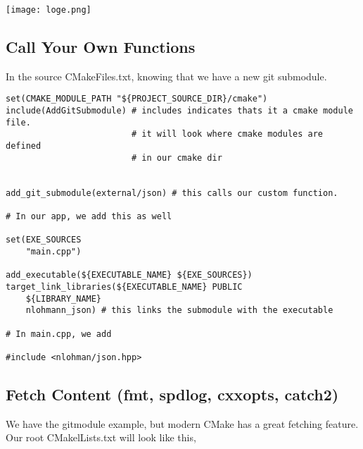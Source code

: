 \documentclass[openany]{report}
\begin{document}
\begin{center}
    \texttt{[image: loge.png]}
\end{center}

\subsection{Call Your Own Functions}

In the source CMakeFiles.txt, knowing that we have a new git submodule.

\begin{verbatim}
set(CMAKE_MODULE_PATH "${PROJECT_SOURCE_DIR}/cmake")
include(AddGitSubmodule) # includes indicates thats it a cmake module file.
                         # it will look where cmake modules are defined
                         # in our cmake dir


add_git_submodule(external/json) # this calls our custom function.

# In our app, we add this as well

set(EXE_SOURCES
    "main.cpp")

add_executable(${EXECUTABLE_NAME} ${EXE_SOURCES})
target_link_libraries(${EXECUTABLE_NAME} PUBLIC
    ${LIBRARY_NAME}
    nlohmann_json) # this links the submodule with the executable

# In main.cpp, we add 

#include <nlohman/json.hpp>
\end{verbatim}


\subsection{Fetch Content (fmt, spdlog, cxxopts, catch2)}

We have the gitmodule example, but modern CMake has a great fetching feature. Our root CMakelLists.txt will look like this, 
\end{document}
